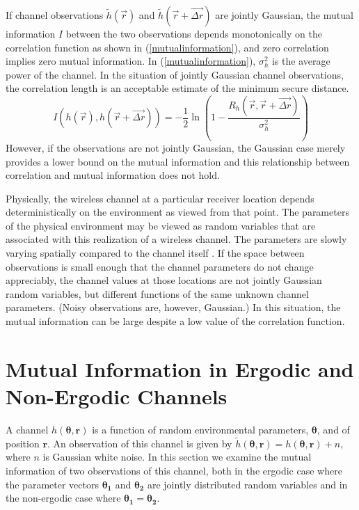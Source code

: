 \documentclass[conference]{ieeetran}
\begin{document}
If channel observations $\tilde{h}(\vec{r})$ and $\tilde{h}(\vec{r}+\vec{\Delta r})$ are jointly Gaussian, the mutual information $I$ between the two observations depends monotonically on the correlation function as shown in (\ref{mutualinformation}), and zero correlation implies zero mutual information.  In   (\ref{mutualinformation}), $\sigma_h^2$ is the average power of the channel.  In the situation of jointly Gaussian channel observations, the correlation length is an acceptable estimate of the minimum secure distance.
\begin{equation}\label{mutualinformation}
I(h(\vec{r}),h(\vec{r}+\vec{\Delta r})) = -\frac{1}{2}\ln\left(1-\frac{R_h(\vec{r},\vec{r}+\vec{\Delta r})}{\sigma_h^2}\right)
\end{equation}
However, if the observations are not jointly Gaussian, the Gaussian case merely provides a lower bound on the mutual information and this relationship between correlation and mutual information does not hold. %

Physically, the wireless channel  at a particular receiver location depends deterministically on the environment as viewed from that point.  The parameters of the physical environment may be viewed as random variables that are associated with this realization of a wireless channel.  The parameters are slowly varying spatially compared to the channel itself \cite{jakes1974, duel-hallen2007}.  If the space between observations is small enough that the channel parameters do not change appreciably, the channel values at those locations are not jointly Gaussian random variables, but different functions of the same unknown channel parameters.  (Noisy observations are, however, Gaussian.)  In this situation, the mutual information can be large despite a low value of the correlation function.

\section{Mutual Information in Ergodic and Non-Ergodic Channels}\label{mutualinf}
A channel $h(\boldsymbol{\theta},\mathbf{r})$ is a function of random environmental parameters, $\boldsymbol{\theta}$, and of position $\mathbf{r}$.  An observation of this channel is given by $\tilde{h}(\boldsymbol{\theta},\mathbf{r})=h(\boldsymbol{\theta},\mathbf{r})+n$, where $n$ is Gaussian white noise.  In this section we examine the mutual information of two observations of this channel, both in the ergodic case where the parameter vectors $\boldsymbol{\theta_1}$ and $\boldsymbol{\theta_2}$ are jointly distributed random variables and in the non-ergodic case where $\boldsymbol{\theta_1}=\boldsymbol{\theta_2}$.  
\end{document}

